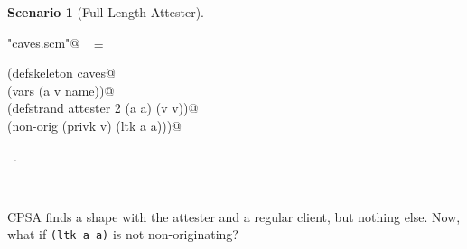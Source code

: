 \documentclass[titlepage,12pt]{article}
\theoremstyle{definition}
\newtheorem{scenario}{Scenario}
\begin{document}
\begin{scenario}[Full Length Attester]
\begin{flushleft} \small
\begin{minipage}{\linewidth} \label{scrap26}
\verb@"caves.scm"@\nobreak\ {\footnotesize {} }$\equiv$
\vspace{-1ex}
\begin{list}{}{} \item
\mbox{}\verb@(defskeleton caves@\\
\mbox{}\verb@  (vars (a v name))@\\
\mbox{}\verb@  (defstrand attester 2 (a a) (v v))@\\
\mbox{}\verb@  (non-orig (privk v) (ltk a a)))@{\NWsep}
\end{list}
\vspace{-1ex}
\footnotesize\addtolength{\baselineskip}{-1ex}
\begin{list}{}{\setlength{\itemsep}{-\parsep}\setlength{\itemindent}{-\leftmargin}}
\item \NWtxtFileDefBy\ .
\end{list}
\end{minipage}\\[4ex]
\end{flushleft}
\end{scenario}

CPSA finds a shape with the attester and a regular client, but nothing else.
Now, what if \texttt{(ltk a a)} is not non-originating?
\end{document}
